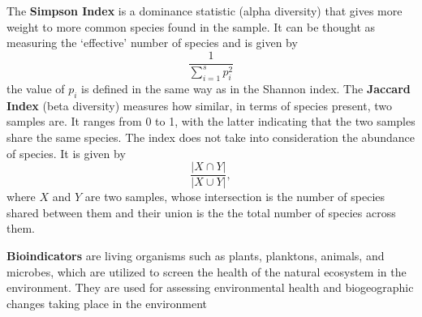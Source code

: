 The \textbf{Simpson Index} is a dominance statistic (alpha diversity) that gives more weight to more common species found in the sample. It can be thought as measuring the `effective' number of species and is given by
$$\frac{1}{\sum_{i=1}^s p_i^2}$$the value of $p_i$ is defined in  the same way as in the Shannon index.
The  \textbf{Jaccard Index} (beta diversity) measures how similar, in terms of species present, two samples are. It ranges from 0 to 1, with the latter indicating that the two samples share the same species. The index does not take into consideration the abundance of species. It is given by
$$\frac{|X \cap Y|}{|X\cup Y|},$$
where $X$ and $Y$ are two samples, whose intersection is the number of species shared between them and their union is the the total number of species across them.


\textbf{Bioindicators} are living organisms such as plants, planktons, animals, and microbes, which are utilized to screen the health of the natural ecosystem in the environment. They are used for assessing environmental health and biogeographic changes taking place in the environment










